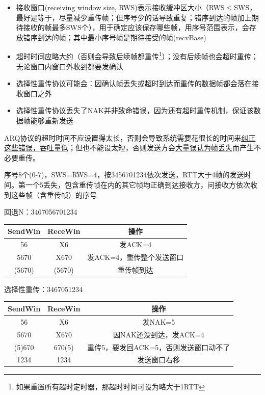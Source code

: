 \begin{itemize}
\begin{figure}[H]
\end{figure}
\begin{itemize}
	\item 接收窗口(receiving window size, RWS)表示接收缓冲区大小（RWS$\leq$SWS，最好是等于，尽量减少重传帧；但序号少的话导致重复；错序到达的帧加上期待接收的帧最多SWS个），用于确定应该保存哪些帧，用序号范围表示，会存放错序到达的帧；其中最小序号帧是期待接受的帧(recvBase)
	\item 超时时间应略大约（否则会导致后续帧都重传\footnote{如果重置所有超时定时器，那超时时间可设为略大于1RTT}）；没有后续帧也会超时重传；无论窗口内窗口外收到都要发确认
	\item 选择性重传协议可能会：因确认帧丢失或超时到达而重传的数据帧都会落在接收窗口之外
	\item 选择性重传协议丢失了NAK并非致命错误，因为还有超时重传机制，保证该数据帧能够重新发送
\end{itemize}
\end{itemize}

ARQ协议的超时时间不应设置得太长，否则会导致系统需要花很长的时间来\underline{纠正这些错误，吞吐量低}；但也不能设太短，否则发送方会\underline{大量误认为帧丢失}而产生不必要重传。


\begin{example}
	序号8个(0-7)，SWS=RWS=4，按3456701234依次发送，RTT大于4帧的发送时间。第一个5丢失，包含重传帧在内的其它帧均正确到达接收方，问接收方依次收到这些帧（含重传帧）的序号
\end{example}
\begin{analysis}
	回退N：3467056701234
	\begin{center}
		\begin{tabular}{|c|c|c|}\hline
			SendWin & ReceWin & 操作\\\hline
			56 & X6 & 发ACK=4\\\hline
			5670 & X670 & 发ACK=4，重传整个发送窗口\\\hline
			(5670) & (5670) & 重传帧到达\\\hline
		\end{tabular}
	\end{center}
	选择性重传：3467051234
	\begin{center}
		\begin{tabular}{|c|c|c|}\hline
			SendWin & ReceWin & 操作\\\hline
			56 & X6 & 发NAK=5\\\hline
			5670 & X670 & 因NAK还没到达，发ACK=4\\\hline
			(5)670 & 670(5) & 重传5，要发回ACK=5，否则发送窗口动不了\\\hline
			1234 & 1234 & 发送窗口右移\\\hline
		\end{tabular}
	\end{center}
\end{analysis}

